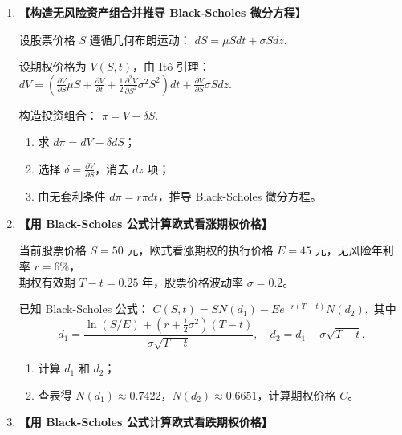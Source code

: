 \documentclass{article}
\begin{document}
\begin{enumerate}[label=\textbf{\arabic*.}]
\item  {\bf{【构造无风险资产组合并推导 Black-Scholes 微分方程】}} %

设股票价格 \(S\) 遵循几何布朗运动：
\(
dS = \mu S dt + \sigma S dz. 
\)

设期权价格为 \(V(S, t)\)，由 Itô 引理：
\(\displaystyle 
dV = \left( \frac{\partial V}{\partial S} \mu S + \frac{\partial V}{\partial t} + \frac{1}{2} \frac{\partial^2 V}{\partial S^2} \sigma^2 S^2 \right) dt + \frac{\partial V}{\partial S} \sigma S dz. 
\)

构造投资组合：
\(
\pi = V - \delta S. 
\)

\begin{enumerate}[label=(\arabic*)]
    \item 求 \(d\pi = dV - \delta dS\)；
    \item 选择 \(\delta = \frac{\partial V}{\partial S}\)，消去 \(dz\) 项；
    \item 由无套利条件 \(d\pi = r\pi dt\)，推导 Black-Scholes 微分方程。
\end{enumerate}





\item  {\bf{【用 Black-Scholes 公式计算欧式看涨期权价格】}} %

当前股票价格 \(S = 50\) 元，欧式看涨期权的执行价格 \(E = 45\) 元，无风险年利率 \(r = 6\%\)， \\ 
期权有效期 \(T - t = 0.25\) 年，股票价格波动率 \(\sigma = 0.2\)。

已知 Black-Scholes 公式：
\(
C(S, t) = SN(d_1) - Ee^{-r(T-t)} N(d_2),  
\)
其中 
\[
d_1 = \frac{\ln(S/E) + \left( r + \frac{1}{2}\sigma^2 \right)(T-t)}{\sigma \sqrt{T-t}}, \quad 
d_2 = d_1 - \sigma \sqrt{T-t}. 
\]

\begin{enumerate}[label=(\arabic*)]
    \item 计算 \(d_1\) 和 \(d_2\)；
    \item 查表得 \(N(d_1) \approx 0.7422\)，\(N(d_2) \approx 0.6651\)，计算期权价格 \(C\)。
\end{enumerate}



\item  {\bf{【用 Black-Scholes 公式计算欧式看跌期权价格】}} %


\end{enumerate}
\end{document}
